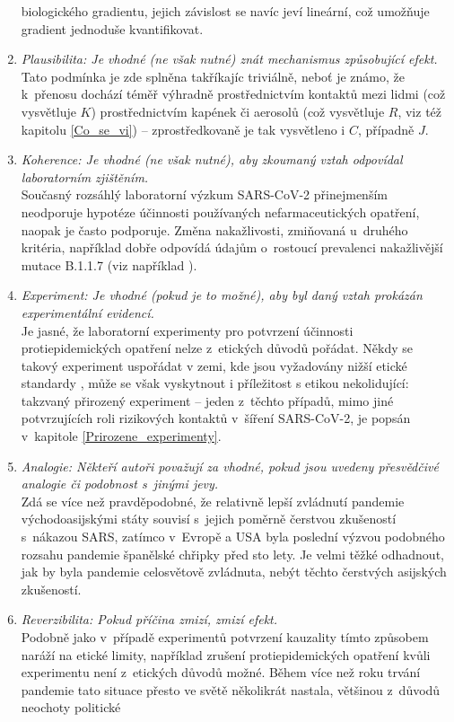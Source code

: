 \begin{enumerate}
biologického gradientu, jejich závislost se navíc jeví lineární, což umožňuje gradient jednoduše kvantifikovat.
\item \emph{Plausibilita: Je vhodné (ne však nutné) znát mechanismus způsobující
efekt.} \\
Tato podmínka je zde splněna takříkajíc triviálně, neboť je známo,
že k~přenosu dochází téměř výhradně prostřednictvím kontaktů mezi lidmi
(což vysvětluje $K$) prostřednictvím kapének či aerosolů (což vysvětluje
$R$, viz též kapitolu \ref{Co_se_vi}) -- zprostředkovaně je tak vysvětleno i $C$, případně $J$.
\item \emph{Koherence: Je vhodné (ne však nutné), aby zkoumaný vztah odpovídal
laboratorním zjištěním.}\\
Současný rozsáhlý laboratorní výzkum SARS-CoV-2 přinejmenším neodporuje
hypotéze účinnosti používaných nefarmaceutických opatření, naopak
je často podporuje. Změna nakažlivosti, zmiňovaná u~druhého kritéria, například dobře odpovídá údajům o~rostoucí prevalenci nakažlivější mutace B.1.1.7 (viz například \cite{diana}).
\item \emph{Experiment: Je vhodné (pokud je to možné), aby byl daný vztah
prokázán experimentální evidencí.}\\
Je jasné, že laboratorní experimenty pro potvrzení účinnosti protiepidemických
opatření nelze z~etických důvodů pořádat. Někdy se takový experiment  uspo\-řá\-dat v zemi, kde jsou vyžadovány nižší etické standardy \cite{abaluck2021impact}, může se však vyskytnout i příležitost s etikou nekolidující:
takzvaný přirozený experiment -- jeden z~těchto případů, mimo jiné potvrzujících
roli rizikových kontaktů v~šíření SARS-CoV-2, je popsán v~kapitole
\ref{Prirozene_experimenty}.
\item \emph{Analogie: Někteří autoři považují za vhodné, pokud jsou 
uvedeny přesvědčivé analogie či podobnost s~jinými jevy.}\\
Zdá se více než pravděpodobné, že relativně lepší zvládnutí pandemie
vý\-cho\-do\-asij\-ský\-mi státy souvisí s~jejich poměrně čerstvou zkušeností
s~nákazou SARS, zatímco v~Evropě a USA byla poslední 
výzvou podobného rozsahu pandemie španělské chřipky před sto lety. Je velmi těžké odhadnout,
jak by byla pandemie celosvětově zvládnuta, nebýt těchto čerstvých
asijských zkušeností.
\item \emph{Reverzibilita: Pokud příčina zmizí, zmizí efekt.}\\
Podobně jako v~případě experimentů potvrzení kauzality tímto způsobem
na\-rá\-ží na etické limity, například zrušení protiepidemických opatření kvůli experimentu není z~etických důvodů možné. Během více než roku trvání pandemie tato situace přesto ve světě několikrát nastala, většinou z~důvodů neochoty politické

\end{enumerate}
